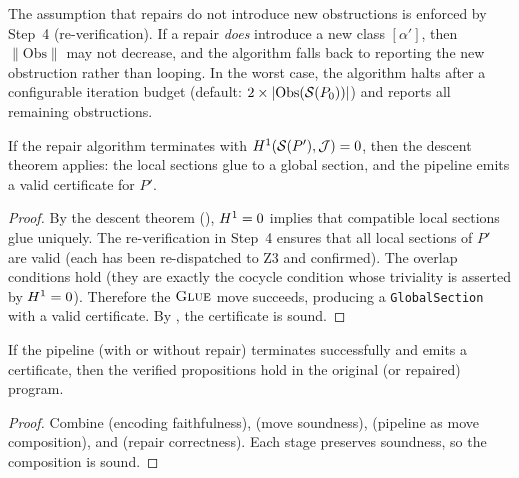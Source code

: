 \begin{remark}\label{rem:non-intro}
The assumption that repairs do not introduce new obstructions is
enforced by Step~4 (re-verification).  If a repair \emph{does}
introduce a new class $[\alpha']$, then $\lVert \mathrm{Obs} \rVert$
may not decrease, and the algorithm falls back to reporting the new
obstruction rather than looping.  In the worst case, the algorithm
halts after a configurable iteration budget (default: $2 \times
|\mathrm{Obs}(\mathcal{S}(P_0))|$) and reports all remaining obstructions.
\end{remark}

\begin{theorem}\label{thm:repair-correct}
If the repair algorithm terminates with $H^{1}(\mathcal{S}(P'), \mathcal{J}) = 0$,
then the descent theorem applies: the local sections glue to a global
section, and the pipeline emits a valid certificate for $P'$.
\end{theorem}

\begin{proof}
By the descent theorem (), $H^{1} = 0$ implies
that compatible local sections glue uniquely.  The re-verification in
Step~4 ensures that all local sections of $P'$ are valid (each has
been re-dispatched to Z3 and confirmed).  The overlap conditions hold
(they are exactly the cocycle condition whose triviality is asserted
by $H^{1} = 0$).  Therefore the $\textsc{Glue}$ move succeeds, producing
a \texttt{GlobalSection} with a valid certificate.  By
, the certificate is sound.
\end{proof}

\begin{corollary}\label{cor:e2e}
If the \JuGeo{} pipeline (with or without repair) terminates
successfully and emits a certificate, then the verified propositions
hold in the original (or repaired) \Python{} program.
\end{corollary}

\begin{proof}
Combine  (encoding faithfulness),
 (move soundness),
 (pipeline as move composition), and
 (repair correctness).  Each stage preserves
soundness, so the composition is sound.
\end{proof}
